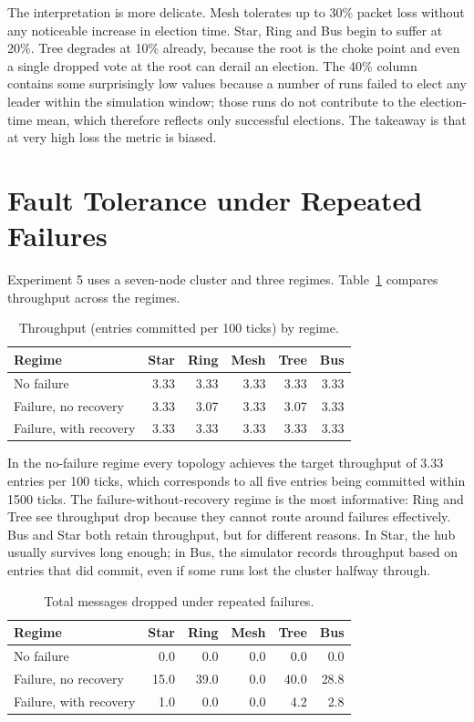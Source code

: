The interpretation is more delicate. Mesh tolerates up to 30\% packet loss without any noticeable increase in election time. Star, Ring and Bus begin to suffer at 20\%. Tree degrades at 10\% already, because the root is the choke point and even a single dropped vote at the root can derail an election. The 40\% column contains some surprisingly low values because a number of runs failed to elect any leader within the simulation window; those runs do not contribute to the election-time mean, which therefore reflects only successful elections. The takeaway is that at very high loss the metric is biased.

\section{Fault Tolerance under Repeated Failures}

Experiment 5 uses a seven-node cluster and three regimes. Table~\ref{tab:exp5_throughput} compares throughput across the regimes.

\begin{table}[H]
\centering
\caption{Throughput (entries committed per 100 ticks) by regime.}
\label{tab:exp5_throughput}
\begin{tabular}{lrrrrr}
\toprule
\textbf{Regime} & \textbf{Star} & \textbf{Ring} & \textbf{Mesh} & \textbf{Tree} & \textbf{Bus} \\
\midrule
No failure              & 3.33 & 3.33 & 3.33 & 3.33 & 3.33 \\
Failure, no recovery    & 3.33 & 3.07 & 3.33 & 3.07 & 3.33 \\
Failure, with recovery  & 3.33 & 3.33 & 3.33 & 3.33 & 3.33 \\
\bottomrule
\end{tabular}
\end{table}

In the no-failure regime every topology achieves the target throughput of 3.33 entries per 100 ticks, which corresponds to all five entries being committed within 1500 ticks. The failure-without-recovery regime is the most informative: Ring and Tree see throughput drop because they cannot route around failures effectively. Bus and Star both retain throughput, but for different reasons. In Star, the hub usually survives long enough; in Bus, the simulator records throughput based on entries that did commit, even if some runs lost the cluster halfway through.

\begin{table}[H]
\centering
\caption{Total messages dropped under repeated failures.}
\label{tab:exp5_dropped}
\begin{tabular}{lrrrrr}
\toprule
\textbf{Regime} & \textbf{Star} & \textbf{Ring} & \textbf{Mesh} & \textbf{Tree} & \textbf{Bus} \\
\midrule
No failure              & 0.0  & 0.0  & 0.0  & 0.0  & 0.0  \\
Failure, no recovery    & 15.0 & 39.0 & 0.0  & 40.0 & 28.8 \\
Failure, with recovery  & 1.0  & 0.0  & 0.0  & 4.2  & 2.8  \\
\bottomrule
\end{tabular}
\end{table}

